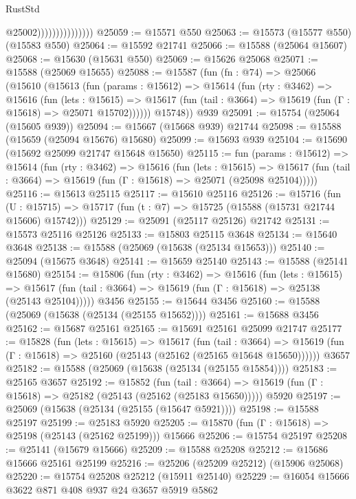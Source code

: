 \begin{lexlean}{RustStd}
\begin{coremodule}
                                  @25002)))))))))))))))
@25059 := @15571 @550
@25063 := @15573 (@15577 @550) (@15583 @550)
@25064 := @15592 @21741
@25066 := @15588 (@25064 @15607)
@25068 := @15630 (@15631 @550)
@25069 := @15626 @25068
@25071 := @15588 (@25069 @15655)
@25088 := @15587
    (fun (fn : @74) =>
    @25066
      (@15610
        (@15613
          (fun (params : @15612) =>
          @15614
            (fun (rty : @3462) =>
            @15616
              (fun (lets : @15615) =>
              @15617 (fun (tail : @3664) => @15619 (fun (Γ : @15618) => @25071 @15702))))))
        @15748))
    @939
@25091 := @15754 (@25064 (@15605 @939))
@25094 := @15667 (@15668 @939) @21744
@25098 := @15588 (@15659 (@25094 @15676) @15680)
@25099 := @15693 @939
@25104 := @15690 (@15692 @25099 @21747 @15648 @15650)
@25115 := fun (params : @15612) =>
  @15614
    (fun (rty : @3462) =>
    @15616
      (fun (lets : @15615) =>
      @15617 (fun (tail : @3664) => @15619 (fun (Γ : @15618) => @25071 (@25098 @25104)))))
@25116 := @15613 @25115
@25117 := @15610 @25116
@25126 := @15716
    (fun (U : @15715) => @15717 (fun (t : @7) => @15725 (@15588 (@15731 @21744 @15606) @15742)))
@25129 := @25091 (@25117 @25126) @21742
@25131 := @15573 @25116 @25126
@25133 := @15803 @25115 @3648
@25134 := @15640 @3648
@25138 := @15588 (@25069 (@15638 (@25134 @15653)))
@25140 := @25094 (@15675 @3648)
@25141 := @15659 @25140
@25143 := @15588 (@25141 @15680)
@25154 := @15806
    (fun (rty : @3462) =>
    @15616
      (fun (lets : @15615) =>
      @15617 (fun (tail : @3664) => @15619 (fun (Γ : @15618) => @25138 (@25143 @25104)))))
    @3456
@25155 := @15644 @3456
@25160 := @15588 (@25069 (@15638 (@25134 (@25155 @15652))))
@25161 := @15688 @3456
@25162 := @15687 @25161
@25165 := @15691 @25161 @25099 @21747
@25177 := @15828
    (fun (lets : @15615) =>
    @15617
      (fun (tail : @3664) =>
      @15619 (fun (Γ : @15618) => @25160 (@25143 (@25162 (@25165 @15648 @15650))))))
    @3657
@25182 := @15588 (@25069 (@15638 (@25134 (@25155 @15854))))
@25183 := @25165 @3657
@25192 := @15852
    (fun (tail : @3664) => @15619 (fun (Γ : @15618) => @25182 (@25143 (@25162 (@25183 @15650)))))
    @5920
@25197 := @25069 (@15638 (@25134 (@25155 (@15647 @5921))))
@25198 := @15588 @25197
@25199 := @25183 @5920
@25205 := @15870 (fun (Γ : @15618) => @25198 (@25143 (@25162 @25199))) @15666
@25206 := @15754 @25197
@25208 := @25141 (@15679 @15666)
@25209 := @15588 @25208
@25212 := @15686 @15666 @25161 @25199
@25216 := @25206 (@25209 @25212) (@15906 @25068)
@25220 := @15754 @25208 @25212 (@15911 @25140)
@25229 := @16054 @15666 @3622 @871 @408 @937 @24 @3657 @5919 @5862

\end{coremodule}
\end{lexlean}
